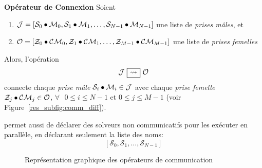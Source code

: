 \begin{lemma}\label{res_op_conn:1ton}
{\bf Opérateur de Connexion \infr{\oneTn}} Soient 
\begin{enumerate} 
\item $\mathcal{J} = \left[\mathcal{S}_0\bullet \mathcal{M}_0, \mathcal{S}_1\bullet \mathcal{M}_1,\dots, \mathcal{S}_{N-1}\bullet \mathcal{M}_{N-1}\right]$ une liste de  {\it prises mâles}, et
\item $\mathcal{O} = \left[\mathcal{Z}_0\bullet \mathcal{CM}_0, \mathcal{Z}_1\bullet \mathcal{CM}_1,\dots, \mathcal{Z}_{M-1}\bullet \mathcal{CM}_{M-1}\right]$ une liste de {\it prises femelles}
\end{enumerate} Alors, l'opération
\[
\mathcal{J} \onetonsep \mathcal{O}
\]
connecte chaque {\it prise mâle} $\mathcal{S}_i\bullet \mathcal{M}_i \in \mathcal{J}$ avec chaque {\it prise femelle} $\mathcal{Z}_j\bullet \mathcal{CM}_j \in \mathcal{O}$, $\forall\textbf{ }0 \leq i \leq N-1$ et $0 \leq j \leq M-1$ (voir Figure~\ref{res_subfig:comm_diff}).
\end{lemma}


\posl{} permet aussi de déclarer des solveurs non communicatifs pour les exécuter en parallèle, en déclarant seulement la liste des noms:
\[
\left[\mathcal{S}_0, \mathcal{S}_1, \dots, \mathcal{S}_{N-1}\right]
\]

\begin{figure}[t]
\centering
{}
\hspace{0.05\textwidth}%
\caption[]{Représentation graphique des opérateurs de communication}
\label{res_fig:comm}
\end{figure}